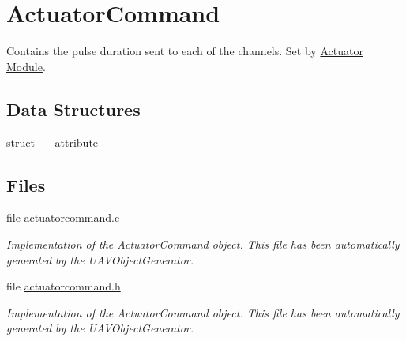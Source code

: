 \hypertarget{group___actuator_command}{\section{\-Actuator\-Command}
\label{group___actuator_command}
}


\-Contains the pulse duration sent to each of the channels. \-Set by \hyperlink{group___actuator_module}{\-Actuator \-Module}.  


\subsection*{\-Data \-Structures}
\begin{DoxyCompactItemize}
\item 
struct \hyperlink{struct____attribute____}{\-\_\-\-\_\-attribute\-\_\-\-\_\-}
\end{DoxyCompactItemize}
\subsection*{\-Files}
\begin{DoxyCompactItemize}
\item 
file \hyperlink{actuatorcommand_8c}{actuatorcommand.\-c}
\begin{DoxyCompactList}\small\item\em \-Implementation of the \-Actuator\-Command object. \-This file has been automatically generated by the \-U\-A\-V\-Object\-Generator. \end{DoxyCompactList}\item 
file \hyperlink{actuatorcommand_8h}{actuatorcommand.\-h}
\begin{DoxyCompactList}\small\item\em \-Implementation of the \-Actuator\-Command object. \-This file has been automatically generated by the \-U\-A\-V\-Object\-Generator. \end{DoxyCompactList}\end{DoxyCompactItemize}
